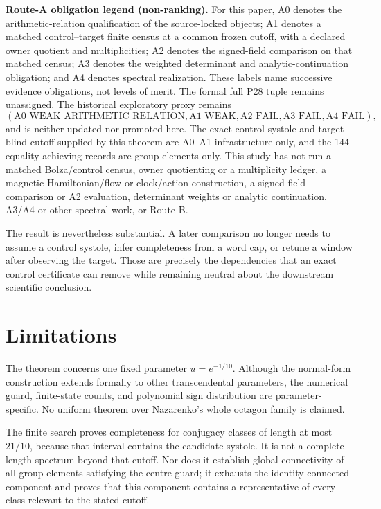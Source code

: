 \documentclass[11pt,a4paper]{article}
\theoremstyle{definition}
\begin{document}
\noindent\textbf{Route-A obligation legend (non-ranking).}
For this paper, A0 denotes the arithmetic-relation qualification of the
source-locked objects; A1 denotes a matched control--target finite census at a
common frozen cutoff, with a declared owner quotient and multiplicities; A2
denotes the signed-field comparison on that matched census; A3 denotes the
weighted determinant and analytic-continuation obligation; and A4 denotes
spectral realization.  These labels name successive evidence obligations,
not levels of merit.  The formal full P28 tuple remains unassigned.  The
historical exploratory proxy remains
\[
 (\mathrm{A0\_WEAK\_ARITHMETIC\_RELATION},
  \mathrm{A1\_WEAK},
  \mathrm{A2\_FAIL},
  \mathrm{A3\_FAIL},
  \mathrm{A4\_FAIL}),
\]
and is neither updated nor promoted here.  The exact control systole and
target-blind cutoff supplied by this theorem are A0--A1 infrastructure only,
and the 144 equality-achieving records are group elements only.  This study
has not run a matched Bolza/control census, owner quotienting or a
multiplicity ledger, a magnetic Hamiltonian/flow or clock/action
construction, a signed-field comparison or A2 evaluation, determinant
weights or analytic continuation, A3/A4 or other spectral work, or Route B.

The result is nevertheless substantial.  A later comparison no longer needs
to assume a control systole, infer completeness from a word cap, or retune a
window after observing the target.  Those are precisely the dependencies that
an exact control certificate can remove while remaining neutral about the
downstream scientific conclusion.

\section{Limitations}

The theorem concerns one fixed parameter \(u=e^{-1/10}\).  Although the
normal-form construction extends formally to other transcendental
parameters, the numerical guard, finite-state counts, and polynomial sign
distribution are parameter-specific.  No uniform theorem over Nazarenko's
whole octagon family is claimed.

The finite search proves completeness for conjugacy classes of length at most
\(21/10\), because that interval contains the candidate systole.  It is not a
complete length spectrum beyond that cutoff.  Nor does it establish global
connectivity of all group elements satisfying the centre guard; it exhausts
the identity-connected component and proves that this component contains a
representative of every class relevant to the stated cutoff.
\end{document}

